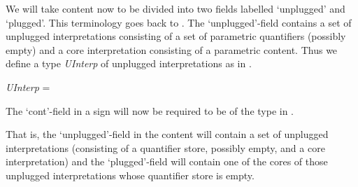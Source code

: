 We will take content now to be divided into two fields labelled
`unplugged' and `plugged'.  This terminology goes back to
\cite{Bos1996}.  The `unplugged'-field contains a set of unplugged
interpretations consisting of a set of parametric quantifiers
(possibly empty) and a core interpretation consisting of a parametric
content.  Thus we define a type \textit{UInterp} of unplugged
interpretations as in \nexteg{}.
\begin{ex} 
\textit{UInterp} = 
\end{ex} 
The `cont'-field in a sign will now be required to be of the type in
\nexteg{}.
\begin{ex} 
\end{ex} 
That is, the `unplugged'-field in the content will contain a set of
unplugged interpretations (consisting of a quantifier store, possibly empty, and a core
interpretation) and the `plugged'-field will contain one of the cores
of those unplugged interpretations whose quantifier store is
empty.

